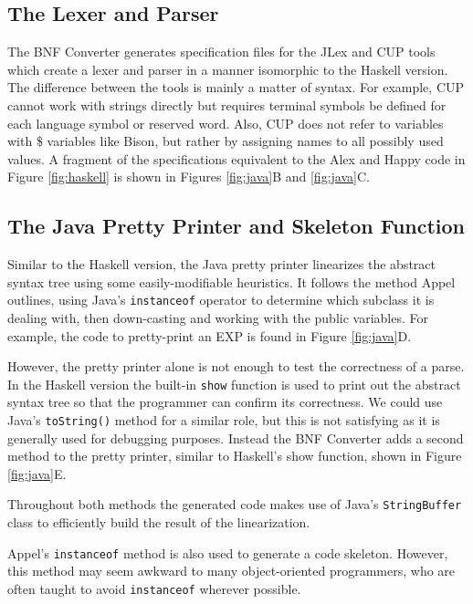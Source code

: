 \documentclass{llncs}
\begin{document}
\subsection{The Lexer and Parser}

The BNF Converter generates specification files for the JLex \cite{jlex} and CUP \cite{cup} tools which create a lexer and parser in a manner isomorphic to the Haskell version. The difference between the tools is mainly a matter of syntax. For example, CUP cannot work with strings directly but requires terminal symbols be defined for each language symbol or reserved word. Also, CUP does not refer to variables with \$ variables like Bison, but rather by assigning names to all possibly used values. A fragment of the specifications equivalent to the Alex and Happy code in Figure \ref{fig:haskell} is shown in Figures \ref{fig:java}B and \ref{fig:java}C.

\subsection{The Java Pretty Printer and Skeleton Function}
\label{javapp}

Similar to the Haskell version, the Java pretty printer linearizes the abstract syntax tree using some easily-modifiable heuristics. It follows the method Appel outlines, using Java's \texttt{instanceof} operator to determine which subclass it is dealing with, then down-casting and working with the public variables. For example, the code to pretty-print an EXP is found in Figure \ref{fig:java}D.

However, the pretty printer alone is not enough to test the correctness of a parse. In the Haskell version the built-in \texttt{show} function is used to print out the abstract syntax tree so that the programmer can confirm its correctness. We could use Java's \texttt{toString()} method for a similar role, but this is not satisfying as it is generally used for debugging purposes. Instead the BNF Converter adds a second method to the pretty printer, similar to Haskell's show function, shown in Figure \ref{fig:java}E.

Throughout both methods the generated code makes use of Java's \texttt{StringBuffer} class to efficiently build the result of the linearization.

Appel's \texttt{instanceof} method is also used to generate a code skeleton. However, this method may seem awkward to many object-oriented programmers, who are often taught to avoid \texttt{instanceof} wherever possible.
\end{document}
